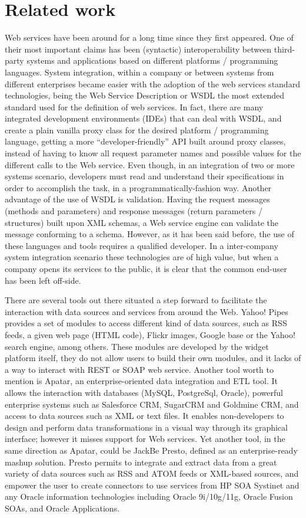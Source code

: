 
\section{Related work}
\label{sec:related_work}

Web services have been around for a long time since they first appeared. One of their most important claims has been (syntactic) interoperability between third-party systems and applications based on different platforms / programming languages. System integration, within a company or between systems from different enterprises became easier with the adoption of the web services standard technologies, being the Web Service Description or WSDL the most extended standard used for the definition of web services. In fact, there are many integrated development environments (IDEs) that can deal with WSDL, and create a plain vanilla proxy class for the desired platform / programming language, getting a more ``developer-friendly'' API built around proxy classes, instead of having to know all request parameter names and possible values for the different calls to the Web service. Even though, in an integration of two or more systems scenario, developers must read and understand their specifications in order to accomplish the task, in a programmatically-fashion way. Another advantage of the use of WSDL is validation. Having the request messages (methods and parameters) and response messages (return parameters / structures) built upon XML schemas, a Web service engine can validate the message conforming to a schema. However, as it has been said before, the use of these languages and tools requires a qualified developer. In a inter-company system integration scenario these technologies are of high value, but when a company opens its services to the public, it is clear that the common end-user has been left off-side.

There are several tools out there situated a step forward to facilitate the interaction with data sources and services from around the Web. Yahoo! Pipes provides a set of modules to access different kind of data sources, such as RSS feeds, a given web page (HTML code), Flickr images, Google base or the Yahoo! search engine, among others. These modules are developed by the widget platform itself, they do not allow users to build their own modules, and it lacks of a way to interact with REST or SOAP web service. Another tool worth to mention is Apatar, an enterprise-oriented data integration and ETL tool. It allows the interaction with databases (MySQL, PostgreSql, Oracle), powerful enterprise systems such as Salesforce CRM, SugarCRM and Goldmine CRM, and access to data sources such as XML or text files. It enables non-developers to design and perform data transformations in a visual way through its graphical interface; however it misses support for Web services. Yet another tool, in the same direction as Apatar, could be JackBe Presto, defined as an enterprise-ready mashup solution. Presto permits to integrate and extract data from a great variety of data sources such as RSS and ATOM feeds or XML-based sources, and empower the user to create connectors to use services from HP SOA Systinet and any Oracle information technologies including Oracle 9i/10g/11g, Oracle Fusion SOAs, and Oracle Applications.
	
